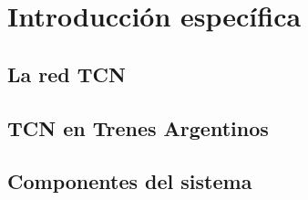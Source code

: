 \chapter{Introducción específica}

\label{cap:IntroEspecifica}

\section{La red TCN}
\label{sec:tcn}

\section{TCN en Trenes Argentinos}
\section{Componentes del sistema}
